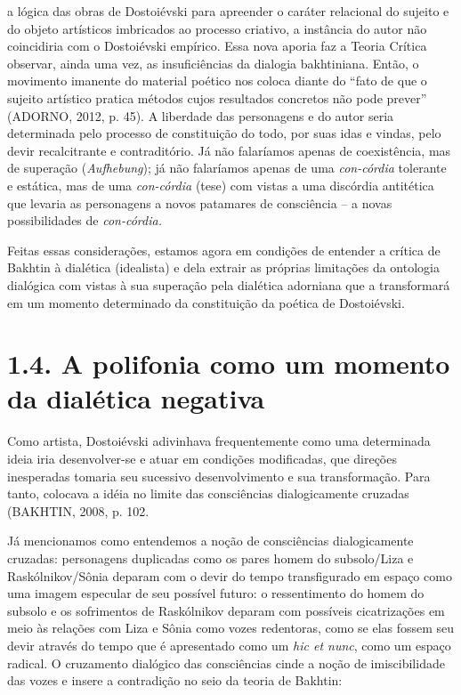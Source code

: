 a lógica das obras de Dostoiévski para apreender o caráter relacional do
sujeito e do objeto artísticos imbricados ao processo criativo, a
instância do autor não coincidiria com o Dostoiévski empírico. Essa nova
aporia faz a Teoria Crítica observar, ainda uma vez, as insuficiências
da dialogia bakhtiniana. Então, o movimento imanente do material poético
nos coloca diante do ``fato de que o sujeito artístico pratica métodos
cujos resultados concretos não pode prever'' (ADORNO, 2012, p. 45). A
liberdade das personagens e do autor seria determinada pelo processo de
constituição do todo, por suas idas e vindas, pelo devir recalcitrante e
contraditório. Já não falaríamos apenas de coexistência, mas de
superação (\emph{Aufhebung}); já não falaríamos apenas de uma
\emph{con-córdia} tolerante e estática, mas de uma \emph{con-córdia}
(tese) com vistas a uma discórdia antitética que levaria as personagens
a novos patamares de consciência -- a novas possibilidades de
\emph{con-córdia.}

Feitas essas considerações, estamos agora em condições de entender a
crítica de Bakhtin à dialética (idealista) e dela extrair as próprias
limitações da ontologia dialógica com vistas à sua superação pela
dialética adorniana que a transformará em um momento determinado da
constituição da poética de Dostoiévski.

\section{1.4. A polifonia como um momento da dialética negativa}

Como artista, Dostoiévski adivinhava frequentemente como uma determinada
ideia iria desenvolver-se e atuar em condições modificadas, que direções
inesperadas tomaria seu sucessivo desenvolvimento e sua transformação.
Para tanto, colocava a idéia no limite das consciências dialogicamente
cruzadas (BAKHTIN, 2008, p. 102.

Já mencionamos como entendemos a noção de consciências dialogicamente
cruzadas: personagens duplicadas como os pares homem do subsolo/Liza e
Raskólnikov/Sônia deparam com o devir do tempo transfigurado em espaço
como uma imagem especular de seu possível futuro: o ressentimento do
homem do subsolo e os sofrimentos de Raskólnikov deparam com possíveis
cicatrizações em meio às relações com Liza e Sônia como vozes
redentoras, como se elas fossem seu devir através do tempo que é
apresentado como um \emph{hic et nunc}, como um espaço radical. O
cruzamento dialógico das consciências cinde a noção de imiscibilidade
das vozes e insere a contradição no seio da teoria de Bakhtin:

